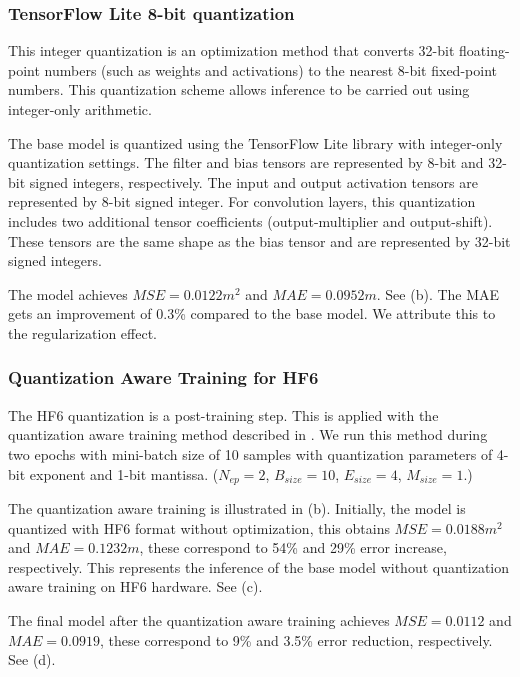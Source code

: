 \subsubsection{TensorFlow Lite 8-bit quantization}
This integer quantization is an optimization method that converts 32-bit floating-point numbers (such as weights and activations) to the nearest 8-bit fixed-point numbers. This quantization scheme allows inference to be carried out using integer-only arithmetic\cite{hannwindowsine}.

The base model is quantized using the TensorFlow Lite library with integer-only quantization settings. The filter and bias tensors are represented by 8-bit and 32-bit signed integers, respectively. The input and output activation tensors are represented by 8-bit signed integer. For convolution layers, this quantization includes two additional tensor coefficients (output-multiplier and output-shift). These tensors are the same shape as the bias tensor and are represented by 32-bit signed integers.

The model achieves $MSE=0.0122 m^2$ and $MAE=0.0952m$. See (b). The MAE gets an improvement of 0.3\% compared to the base model. We attribute this to the regularization effect.

\subsubsection{Quantization Aware Training for HF6}
The HF6 quantization is a post-training step. This is applied with the quantization aware training method described in . We run this method during two epochs with mini-batch size of 10 samples with quantization parameters of 4-bit exponent and 1-bit mantissa. ($N_{ep}=2$, $B_{size}=10$, $E_{size}=4$, $M_{size}=1$.)

The quantization aware training is illustrated in (b). Initially, the model is quantized with HF6 format without optimization, this obtains $MSE=0.0188m^2$ and $MAE=0.1232m$, these correspond to 54\% and 29\% error increase, respectively. This represents the inference of the base model without quantization aware training on HF6 hardware. See (c).

The final model after the quantization aware training achieves $MSE=0.0112$ and $MAE=0.0919$, these correspond to 9\% and 3.5\% error reduction, respectively. See (d).

